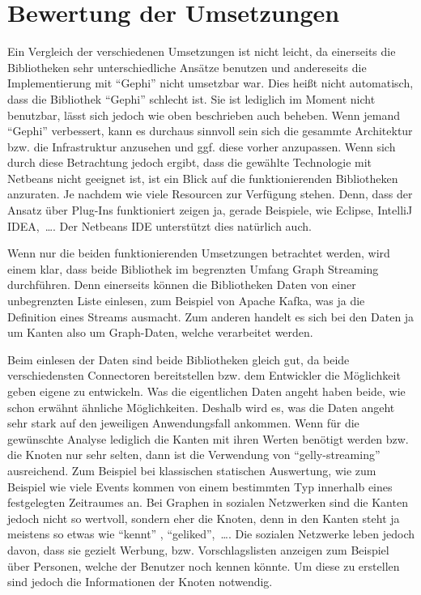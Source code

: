 \section{Bewertung der Umsetzungen}
Ein Vergleich der verschiedenen Umsetzungen ist nicht leicht, da einerseits die
Bibliotheken sehr unterschiedliche Ansätze benutzen und andereseits die
Implementierung mit \enquote{Gephi} nicht umsetzbar war. Dies heißt nicht
automatisch, dass die Bibliothek \enquote{Gephi} schlecht ist. Sie ist lediglich
im Moment nicht benutzbar, lässt sich jedoch wie oben beschrieben auch beheben.
Wenn jemand \enquote{Gephi} verbessert, kann es durchaus sinnvoll sein sich die
gesammte Architektur bzw. die Infrastruktur anzusehen und ggf. diese vorher
anzupassen. Wenn sich durch diese Betrachtung jedoch ergibt, dass die gewählte
Technologie mit Netbeans nicht geeignet ist, ist ein Blick auf die
funktionierenden Bibliotheken anzuraten. Je nachdem wie viele Resourcen zur
Verfügung stehen. Denn, dass der Ansatz über Plug-Ins funktioniert zeigen ja,
gerade Beispiele, wie Eclipse, IntelliJ IDEA,~\dots . Der Netbeans \gls{IDE}
unterstützt dies natürlich auch.

Wenn nur die beiden funktionierenden Umsetzungen betrachtet werden, wird einem
klar, dass beide Bibliothek im begrenzten Umfang Graph Streaming durchführen.
Denn einerseits können die Bibliotheken Daten von einer unbegrenzten Liste
einlesen, zum Beispiel von Apache Kafka, was ja die Definition eines Streams
ausmacht. Zum anderen handelt es sich bei den Daten ja um Kanten also um
Graph-Daten, welche verarbeitet werden.

Beim einlesen der Daten sind beide Bibliotheken gleich gut, da beide
verschiedensten Connectoren bereitstellen bzw. dem Entwickler die Möglichkeit
geben eigene zu entwickeln. Was die eigentlichen Daten angeht haben beide, wie
schon erwähnt ähnliche Möglichkeiten. Deshalb wird es, was die Daten angeht sehr
stark auf den jeweiligen Anwendungsfall ankommen. Wenn für die gewünschte Analyse
lediglich die Kanten mit ihren Werten benötigt werden bzw. die Knoten nur sehr
selten, dann ist die Verwendung von \enquote{gelly-streaming} ausreichend. Zum
Beispiel bei klassischen statischen Auswertung, wie zum Beispiel wie viele Events
kommen von einem bestimmten Typ innerhalb eines festgelegten Zeitraumes an. Bei
Graphen in sozialen Netzwerken sind die Kanten jedoch nicht so wertvoll, sondern
eher die Knoten, denn in den Kanten steht ja meistens so etwas wie \enquote{kennt}
, \enquote{geliked},~\dots . Die sozialen Netzwerke leben jedoch davon, dass sie
gezielt Werbung, bzw. Vorschlagslisten anzeigen zum Beispiel über Personen,
welche der Benutzer noch kennen könnte. Um diese zu erstellen sind jedoch die
Informationen der Knoten notwendig.


